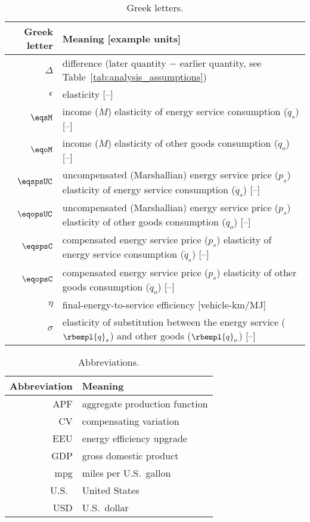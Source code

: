 
\begin{table}
\centering %
\caption{Greek letters.}
\begin{tabular}{r l}
  \toprule
  Greek letter & Meaning [example units] \\
  \midrule
  $\Delta$   & difference (later quantity $-$ earlier quantity, see Table~\ref{tab:analysis_assumptions}) \\
  $\epsilon$ & elasticity [--] \\
  $\eqsM$    & income ($\dot{M}$) elasticity of energy service consumption ($\dot{q}_s$) [--] \\
  $\eqoM$    & income ($\dot{M}$) elasticity of other goods consumption ($\dot{q}_o$) [--] \\
  $\eqspsUC$ & uncompensated (Marshallian) energy service price ($p_s$) elasticity of energy service consumption ($\dot{q}_s$) [--] \\
  $\eqopsUC$ & uncompensated (Marshallian) energy service price ($p_s$) elasticity of other goods consumption ($\dot{q}_o$) [--] \\
  $\eqspsC$   & compensated energy service price ($p_s$) elasticity of energy service consumption ($\dot{q}_s$) [--] \\
  $\eqopsC$   & compensated energy service price ($p_s$) elasticity of other goods consumption ($\dot{q}_o$) [--] \\
  $\eta$     & final-energy-to-service efficiency [vehicle-km/MJ] \\
  $\sigma$   & elasticity of substitution between the energy service ($\rbempl{q}_s$) and other goods ($\rbempl{q}_o$) [--] \\
  \bottomrule
\end{tabular}
\label{tab:greek}
\end{table}



\begin{table}
\centering %
\caption{Abbreviations.}
\begin{tabular}{r l}
  \toprule
  Abbreviation & Meaning \\
  \midrule
  APF & aggregate production function \\
  CV & compensating variation \\
  EEU & energy efficiency upgrade \\
  GDP & gross domestic product \\
  mpg & miles per U.S.\ gallon \\
  U.S.\ & United States \\
  USD & U.S.\ dollar \\
  \bottomrule
\end{tabular}
\label{tab:abbreviations}
\end{table}


